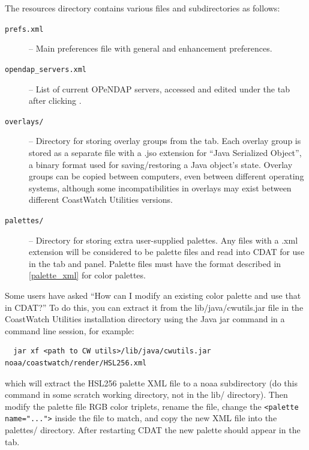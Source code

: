 The resources directory contains various files and subdirectories
as follows:
\begin{description}

\item[{\tt prefs.xml}] -- Main preferences file with general and
enhancement preferences.

\item[{\tt opendap\_servers.xml}] -- List of current OPeNDAP
servers, accessed and edited under the
 tab after clicking
.

\item[{\tt overlays/}] -- Directory for storing overlay groups
from the  tab.  Each overlay group
is stored as a separate file with a {\file .jso} extension for
``Java Serialized Object'', a binary format used for
saving/restoring a Java object's state.  Overlay groups can be
copied between computers, even between different operating
systems, although some incompatibilities in overlays may exist
between different CoastWatch Utilities versions.

\item[{\tt palettes/}] -- Directory for storing extra
user-supplied palettes.  Any files with a {\file .xml} extension
will be considered to be palette files and read into CDAT for use
in the  tab and
 panel.  Palette files must have
the format described in \autoref{palette_xml} for color palettes.

\end{description}

Some users have asked ``How can I modify an existing color
palette and use that in CDAT?''  To do this, you can extract it
from the {\file lib/java/cwutils.jar} file in the CoastWatch Utilities
installation directory using the Java jar command in a command
line session, for example:
\begin{verbatim}
  jar xf <path to CW utils>/lib/java/cwutils.jar noaa/coastwatch/render/HSL256.xml
\end{verbatim}
which will extract the HSL256 palette XML file to a {\file noaa}
subdirectory (do this command in some scratch working directory,
not in the {\file lib/} directory).  Then modify the palette file
RGB color triplets, rename the file, change the
\verb+<palette name="...">+ inside the file to match, and copy
the new XML file into the {\file palettes/} directory.  After
restarting CDAT the new palette should appear in the
 tab.

